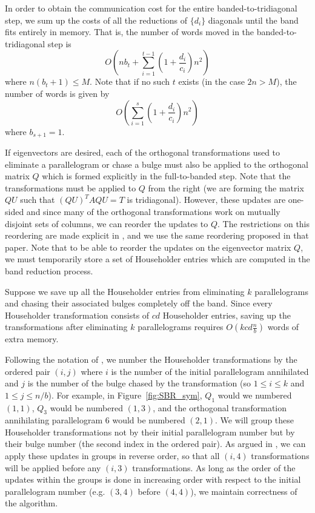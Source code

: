 \documentclass{article}
\def\lt{\left}
\def\rt{\right}
\theoremstyle{definition}
\begin{document}
In order to obtain the communication cost for the entire banded-to-tridiagonal step, we sum up the costs of all the reductions of $\{d_i\}$ diagonals until the band fits entirely in memory.  That is, the number of words moved in the banded-to-tridiagonal step is
$$O\lt(nb_t + \sum_{i=1}^{t-1} \lt(1+\frac{d_i}{c_i}\rt)n^2 \rt)$$
where $n(b_t+1) \leq M$.  Note that if no such $t$ exists (in the case $2n>M$), the number of words is given by
$$O\lt(\sum_{i=1}^{s} \lt(1+\frac{d_i}{c_i}\rt)n^2 \rt)$$
where $b_{s+1}=1$.

If eigenvectors are desired, each of the orthogonal transformations used to eliminate a parallelogram or chase a bulge must also be applied to the orthogonal matrix $Q$ which is formed explicitly in the full-to-banded step.  Note that the transformations must be applied to $Q$ from the right (we are forming the matrix $QU$ such that $(QU)^TAQU=T$ is tridiagonal).  However, these updates are one-sided and since many of the orthogonal transformations work on mutually disjoint sets of columns, we can reorder the updates to $Q$.  The restrictions on this reordering are made explicit in \cite{prism:17}, and we use the same reordering proposed in that paper.  Note that to be able to reorder the updates on the eigenvector matrix $Q$, we must temporarily store a set of Householder entries which are computed in the band reduction process.

Suppose we save up all the Householder entries from eliminating $k$ parallelograms and chasing their associated bulges completely off the band.  Since every Householder transformation consists of $cd$ Householder entries, saving up the transformations after eliminating $k$ parallelograms requires $O\lt(kcd\frac nb\rt)$ words of extra memory.  

Following the notation of \cite{prism:17}, we number the Householder transformations by the ordered pair $(i,j)$ where $i$ is the number of the initial parallelogram annihilated and $j$ is the number of the bulge chased by the transformation (so $1\leq i\leq k$ and $1\leq j\leq n/b$).  For example, in Figure~\ref{fig:SBR_sym}, $Q_1$ would we numbered $(1,1)$, $Q_3$ would be numbered $(1,3)$, and the orthogonal transformation annihilating parallelogram $6$ would be numbered $(2,1)$.  We will group these Householder transformations not by their initial parallelogram number but by their bulge number (the second index in the ordered pair).  As argued in \cite{prism:17}, we can apply these updates in groups in reverse order, so that all $(i,4)$ transformations will be applied before any $(i,3)$ transformations.  As long as the order of the updates within the groups is done in increasing order with respect to the initial parallelogram number (e.g. $(3,4)$ before $(4,4)$), we maintain correctness of the algorithm.
\end{document}
